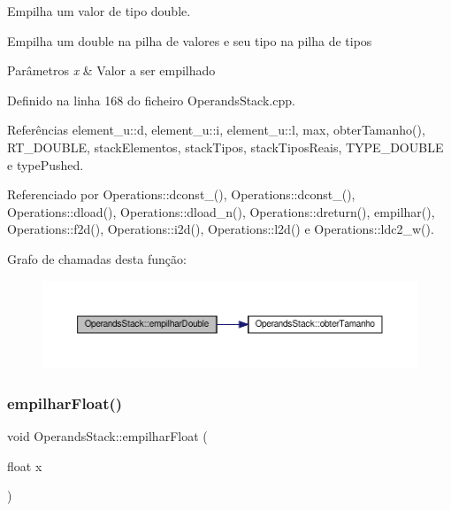 Empilha um valor de tipo double. 

Empilha um double na pilha de valores e seu tipo na pilha de tipos


\begin{DoxyParams}{Parâmetros}
{\em x} & Valor a ser empilhado \\
\hline
\end{DoxyParams}


Definido na linha 168 do ficheiro Operands\+Stack.\+cpp.



Referências element\+\_\+u\+::d, element\+\_\+u\+::i, element\+\_\+u\+::l, max, obter\+Tamanho(), R\+T\+\_\+\+D\+O\+U\+B\+LE, stack\+Elementos, stack\+Tipos, stack\+Tipos\+Reais, T\+Y\+P\+E\+\_\+\+D\+O\+U\+B\+LE e type\+Pushed.



Referenciado por Operations\+::dconst\+\_(), Operations\+::dconst\+\_(), Operations\+::dload(), Operations\+::dload\+\_\+n(), Operations\+::dreturn(), empilhar(), Operations\+::f2d(), Operations\+::i2d(), Operations\+::l2d() e Operations\+::ldc2\+\_\+w().

Grafo de chamadas desta função\+:\nopagebreak
\begin{figure}[H]
\begin{center}
\leavevmode
\includegraphics[width=350pt]{classOperandsStack_a45dde91cc54ad980d1cbb7cdb1e084cd_cgraph}
\end{center}
\end{figure}
\mbox{\label{classOperandsStack_aeed478b52748b87ac85db261332b633b}} 
\subsubsection{\texorpdfstring{empilhar\+Float()}{empilharFloat()}}
{\footnotesize\ttfamily void Operands\+Stack\+::empilhar\+Float (\begin{DoxyParamCaption}\item[{float}]{x }\end{DoxyParamCaption})}



